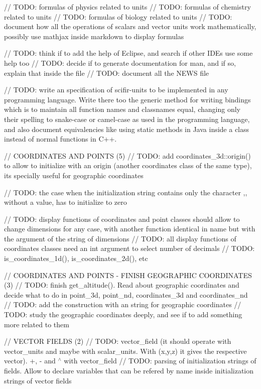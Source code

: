 // TODO\+: formulas of physics related to units // TODO\+: formulas of chemistry related to units // TODO\+: formulas of biology related to units // TODO\+: document how all the operations of scalars and vector units work mathematically, possibly use mathjax inside markdown to display formulas

// TODO\+: think if to add the help of Eclipse, and search if other IDEs use some help too // TODO\+: decide if to generate documentation for man, and if so, explain that inside the  file // TODO\+: document all the NEWS file

// TODO\+: write an specification of scifir-\/units to be implemented in any programming language. Write there too the generic method for writing bindings which is to maintain all function names and classnames equal, changing only their spelling to snake-\/case or camel-\/case as used in the programming language, and also document equivalencies like using static methods in Java inside a class instead of normal functions in C++.

// COORDINATES AND POINTS (5) // TODO\+: add coordinates\+\_\+3d\+::origin() to allow to initialize with an origin (another coordinates class of the same type), it\textquotesingle{}s specially useful for geographic coordinates

// TODO\+: the case when the initialization string contains only the character \textquotesingle{},\textquotesingle{}, without a value, has to initialize to zero

// TODO\+: display functions of coordinates and point classes should allow to change dimensions for any case, with another function identical in name but with the argument of the string of dimensions // TODO\+: all display functions of coordinates classes need an int argument to select number of decimals // TODO\+: is\+\_\+coordinates\+\_\+1d(), is\+\_\+coordinates\+\_\+2d(), etc

// COORDINATES AND POINTS -\/ FINISH GEOGRAPHIC COORDINATES (3) // TODO\+: finish get\+\_\+altitude(). Read about geographic coordinates and decide what to do in point\+\_\+3d, point\+\_\+nd, coordinates\+\_\+3d and coordinates\+\_\+nd // TODO\+: add the construction with an string for geographic coordinates // TODO\+: study the geographic coordinates deeply, and see if to add something more related to them

// VECTOR FIELDS (2) // TODO\+: vector\+\_\+field (it should operate with vector\+\_\+units and maybe with scalar\+\_\+units. With (x,y,z) it gives the respective vector). +, -\/ and \texorpdfstring{$^\wedge$}{\string^} with vector\+\_\+field // TODO\+: parsing of initialization strings of fields. Allow to declare variables that can be refered by name inside initialization strings of vector fields

